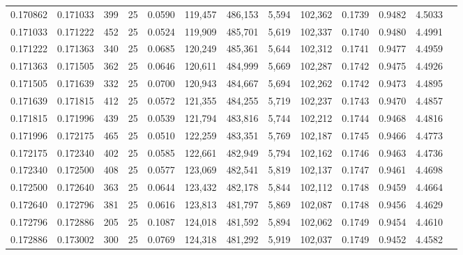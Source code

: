 \begin{tabular}{rrrrrrrrrrrrr}
0.170862 & 0.171033 &   399 &  25 &                                     0.0590 & 119,457 & 486,153 &   5,594 & 102,362 & 0.1739 & 0.9482 & 4.5033 \\
0.171033 & 0.171222 &   452 &  25 &                                     0.0524 & 119,909 & 485,701 &   5,619 & 102,337 & 0.1740 & 0.9480 & 4.4991 \\
0.171222 & 0.171363 &   340 &  25 &                                     0.0685 & 120,249 & 485,361 &   5,644 & 102,312 & 0.1741 & 0.9477 & 4.4959 \\
0.171363 & 0.171505 &   362 &  25 &                                     0.0646 & 120,611 & 484,999 &   5,669 & 102,287 & 0.1742 & 0.9475 & 4.4926 \\
0.171505 & 0.171639 &   332 &  25 &                                     0.0700 & 120,943 & 484,667 &   5,694 & 102,262 & 0.1742 & 0.9473 & 4.4895 \\
0.171639 & 0.171815 &   412 &  25 &                                     0.0572 & 121,355 & 484,255 &   5,719 & 102,237 & 0.1743 & 0.9470 & 4.4857 \\
0.171815 & 0.171996 &   439 &  25 &                                     0.0539 & 121,794 & 483,816 &   5,744 & 102,212 & 0.1744 & 0.9468 & 4.4816 \\
0.171996 & 0.172175 &   465 &  25 &                                     0.0510 & 122,259 & 483,351 &   5,769 & 102,187 & 0.1745 & 0.9466 & 4.4773 \\
0.172175 & 0.172340 &   402 &  25 &                                     0.0585 & 122,661 & 482,949 &   5,794 & 102,162 & 0.1746 & 0.9463 & 4.4736 \\
0.172340 & 0.172500 &   408 &  25 &                                     0.0577 & 123,069 & 482,541 &   5,819 & 102,137 & 0.1747 & 0.9461 & 4.4698 \\
0.172500 & 0.172640 &   363 &  25 &                                     0.0644 & 123,432 & 482,178 &   5,844 & 102,112 & 0.1748 & 0.9459 & 4.4664 \\
0.172640 & 0.172796 &   381 &  25 &                                     0.0616 & 123,813 & 481,797 &   5,869 & 102,087 & 0.1748 & 0.9456 & 4.4629 \\
0.172796 & 0.172886 &   205 &  25 &                                     0.1087 & 124,018 & 481,592 &   5,894 & 102,062 & 0.1749 & 0.9454 & 4.4610 \\
0.172886 & 0.173002 &   300 &  25 &                                     0.0769 & 124,318 & 481,292 &   5,919 & 102,037 & 0.1749 & 0.9452 & 4.4582 \\

\end{tabular}
